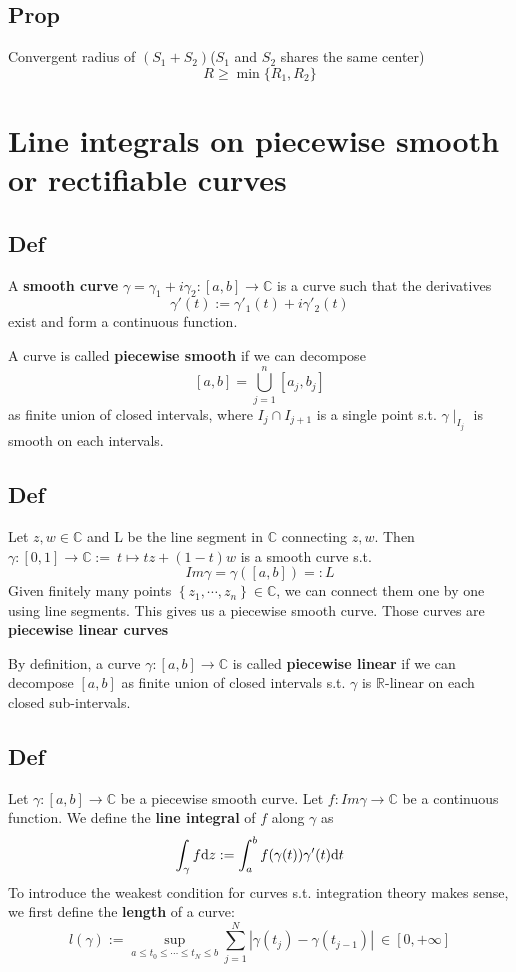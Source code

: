 \documentclass{book}
\newcommand{\abs}[1]{\left\lvert #1 \right\rvert}
\newcommand{\set}[1]{\left\{#1\right\}}
\begin{document}
\section{Prop}
Convergent radius of $(S_1+S_2)$($S_1$ and $S_2$ shares the same center)
$$R\geq\min\{R_1,R_2\}$$

\chapter{Line integrals on piecewise smooth or rectifiable curves}
\section{Def}
A \textbf{smooth curve} $\gamma=\gamma_1+i\gamma_2:[a,b]\to \mathbb C$ is a curve such that the derivatives $$\gamma'(t):=\gamma'_1(t)+i\gamma'_2(t)$$ exist and form a continuous function. 

A curve is called \textbf{piecewise smooth} if we can decompose $$[a,b]=\bigcup\limits_{j=1}^n[a_j,b_j]$$ as finite union of closed intervals, where $I_j\cap I_{j+1}$ is a single point s.t. $\gamma\mid_{I_j}$ is smooth on each intervals.
\section{Def}
Let $z,w\in \mathbb C$ and L be the line segment in $\mathbb C$ connecting $z,w$. Then $\gamma:[0,1]\to \mathbb C:=\ t\mapsto tz+(1-t)w$ is a smooth curve s.t. $$Im\gamma=\gamma([a,b]) =:L$$
Given finitely many points $\set{z_1,\cdots,z_n}\in \mathbb C$, we can connect them one by one using line segments. This gives us a piecewise smooth curve. Those curves are \textbf{piecewise linear curves}

By definition, a curve $\gamma:[a,b]\to \mathbb C$ is called \textbf{piecewise linear} if we can decompose $[a,b]$ as finite union of closed intervals s.t. $\gamma$ is $\mathbb R$-linear on each closed sub-intervals.
\section{Def}
Let $\gamma:[a,b]\to \mathbb C$ be a piecewise smooth curve. Let $f:Im\gamma\to \mathbb C$ be a continuous function. We define the \textbf{line integral} of $f$ along $\gamma$ as
$$\int_\gamma f\text dz:=\int_a^bf(\gamma(t))\gamma'(t)\text dt$$
To introduce the weakest condition for curves s.t. integration theory makes sense, we first define the \textbf{length} of a curve:
$$l(\gamma):=\sup\limits_{a\leq t_0\leq\cdots\leq t_N\leq b}\sum\limits_{j=1}^N\abs{\gamma(t_j)-\gamma(t_{j-1})}\ \in [0,+\infty]$$
\end{document}
